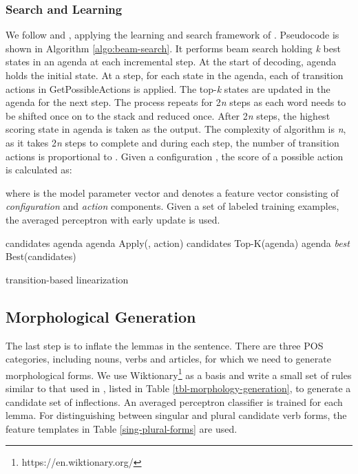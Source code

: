 \documentclass[11pt]{article}
\begin{document}
\subsubsection{Search and Learning}
  We follow  and , applying the learning and search framework of . Pseudocode is shown in Algorithm \ref{algo:beam-search}. It performs beam search holding {\it k} best states in an agenda at each incremental step. At the start of decoding, agenda holds the initial state. At a step, for each state in the agenda, each of transition actions in {\sc GetPossibleActions} is applied. The top-{\it k} states are updated in the agenda for the next step. The process repeats for 2{\it n} steps as each word needs to be shifted once on to the stack and reduced once. After 2{\it n} steps, the highest scoring state in agenda is taken as the output. The complexity of algorithm is {\it n}, as it takes 2{\it n} steps to complete and during each step, the number of transition actions is proportional to .
  Given a configuration , the score of a possible action  is calculated as: \vspace*{-0.3em}
  
  where  is the model parameter vector and  denotes a feature vector consisting of {\it configuration} and {\it action} components. Given a set of labeled training examples, the averaged perceptron with early update \cite{collins2004incremental} is used.

\begin{algorithm}[t]
\small
\DontPrintSemicolon {}
candidates  \;
agenda  \;
\For{} {
   {
     {
      agenda  {\sc Apply}(, action)\;
    }
  }
  candidates  {\sc Top-K}(agenda) \;
  agenda  \;
}
{\it best}  {\sc Best}(candidates) \;
\;
\caption{transition-based linearization}
\label{algo:beam-search}
\end{algorithm}  
  
\subsection{Morphological Generation}
\label{morphological-generation}
The last step is to inflate the lemmas in the sentence. There are three POS categories, including nouns, verbs and articles, for which we need to generate morphological forms. We use Wiktionary\footnote{https://en.wiktionary.org/} as a basis and write a small set of rules similar to that used in , listed in Table \ref{tbl-morphology-generation}, to generate a candidate set of inflections. An averaged perceptron classifier \cite{W02-1001} is trained for each lemma. For distinguishing between singular and plural candidate verb forms, the feature templates in Table \ref{sing-plural-forms} are used.
\end{document}
